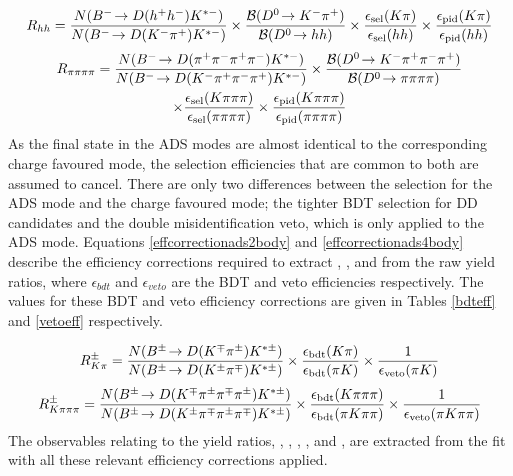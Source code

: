 {\footnotesize
\begin{equation}
R_{hh} = \frac{N({{{B}^-}}\!\rightarrow {\ensuremath{D}}(h^+h^-){{K}^{*-}})}{N({{{B}^-}}\!\rightarrow {\ensuremath{D}}({{K}^-}{{\pi}^+}){{K}^{*-}})} \times \frac{{\mathcal{B}}({{D}^0}\!\rightarrow {\ensuremath{{K}^-}}{\ensuremath{{\pi}^+}})}{{\mathcal{B}}({{D}^0}\!\rightarrow hh)} \times \frac{\epsilon_{\text{sel}}(K\pi)}{\epsilon_{\text{sel}}(hh)} \times \frac{\epsilon_{\text{pid}}(K\pi)}{\epsilon_{\text{pid}}(hh)}
\label{effcorrectionglw2body}
\end{equation}
\begin{multline}
R_{\pi\pi\pi\pi} = \frac{N({{{B}^-}}\!\rightarrow {\ensuremath{D}}({{\pi}^+}{{\pi}^-}{{\pi}^+}{{\pi}^-}){{K}^{*-}})}{N({{{B}^-}}\!\rightarrow {\ensuremath{D}}({{K}^-}{{\pi}^+}{{\pi}^-}{{\pi}^+}){{K}^{*-}})} \times \frac{{\mathcal{B}}({{D}^0}\!\rightarrow {\ensuremath{{K}^-}}{\ensuremath{{\pi}^+}}{\ensuremath{{\pi}^-}}{\ensuremath{{\pi}^+}})}{{\mathcal{B}}({{D}^0}\!\rightarrow \pi\pi\pi\pi)} \\ \times \frac{\epsilon_{\text{sel}}(K\pi\pi\pi)}{\epsilon_{\text{sel}}(\pi\pi\pi\pi)} \times \frac{\epsilon_{\text{pid}}(K\pi\pi\pi)}{\epsilon_{\text{pid}}(\pi\pi\pi\pi)} 
\label{effcorrectionglw4body}
\end{multline}}
As the final state in the ADS modes are almost identical to the corresponding charge favoured mode, the selection efficiencies that are common to both are assumed to cancel. There are only two differences between the selection for the ADS mode and the charge favoured mode; the tighter BDT selection for DD candidates and the double misidentification veto, which is only applied to the ADS mode. Equations \ref{effcorrectionads2body} and \ref{effcorrectionads4body} describe the efficiency corrections required to extract \Rptwo, \Rmtwo, \Rpfour and \Rmfour from the raw yield ratios, where $\epsilon_{bdt}$ and $\epsilon_{veto}$ are the BDT and veto efficiencies respectively. The values for these BDT and veto efficiency corrections are given in Tables \ref{bdteff} and \ref{vetoeff} respectively.

{\footnotesize
\begin{equation}
R^{\pm}_{K\pi} = \frac{N({{B}^\pm}\!\rightarrow {\ensuremath{D}}({{K}^\mp}{{\pi}^\pm}){{K}^{*\pm}})}{N({{B}^\pm}\!\rightarrow {\ensuremath{D}}({{K}^\pm}{{\pi}^\mp}){{K}^{*\pm}})} \times \frac{\epsilon_{\text{bdt}}(K\pi)}{\epsilon_{\text{bdt}}(\pi K)} \times \frac{1}{\epsilon_{\text{veto}}(\pi K)}
\label{effcorrectionads2body}
\end{equation}
\begin{equation}
R^{\pm}_{K\pi\pi\pi} = \frac{N({{B}^\pm}\!\rightarrow {\ensuremath{D}}({{K}^\mp}{{\pi}^\pm}{{\pi}^\mp}{{\pi}^\pm}){{K}^{*\pm}})}{N({{B}^\pm}\!\rightarrow {\ensuremath{D}}({{K}^\pm}{{\pi}^\mp}{{\pi}^\pm}{{\pi}^\mp}){{K}^{*\pm}})} \times \frac{\epsilon_{\text{bdt}}(K\pi\pi\pi)}{\epsilon_{\text{bdt}}(\pi K\pi\pi)} \times \frac{1}{\epsilon_{\text{veto}}(\pi K\pi\pi)}
\label{effcorrectionads4body}
\end{equation}}
The \CP observables relating to the yield ratios, \Rkk, \Rpipi, \Rptwo,  \Rmtwo \Rpipipipi, \Rpfour and  \Rmfour, are extracted from the \CP fit with all these relevant efficiency corrections applied.

